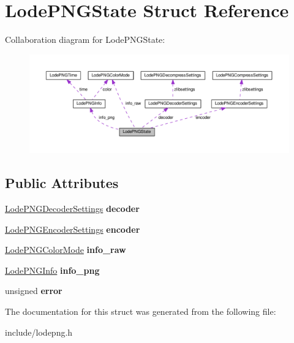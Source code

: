\hypertarget{struct_lode_p_n_g_state}{}\section{Lode\+P\+N\+G\+State Struct Reference}
\label{struct_lode_p_n_g_state}


Collaboration diagram for Lode\+P\+N\+G\+State\+:
\nopagebreak
\begin{figure}[H]
\begin{center}
\leavevmode
\includegraphics[width=350pt]{struct_lode_p_n_g_state__coll__graph}
\end{center}
\end{figure}
\subsection*{Public Attributes}
\begin{DoxyCompactItemize}
\item 
\hyperlink{struct_lode_p_n_g_decoder_settings}{Lode\+P\+N\+G\+Decoder\+Settings} {\bfseries decoder}\hypertarget{struct_lode_p_n_g_state_abd2c38ffc68f04b0e4159e1f97ba1f76}{}\label{struct_lode_p_n_g_state_abd2c38ffc68f04b0e4159e1f97ba1f76}

\item 
\hyperlink{struct_lode_p_n_g_encoder_settings}{Lode\+P\+N\+G\+Encoder\+Settings} {\bfseries encoder}\hypertarget{struct_lode_p_n_g_state_ac63d91db835129d02eb83bbe81de347e}{}\label{struct_lode_p_n_g_state_ac63d91db835129d02eb83bbe81de347e}

\item 
\hyperlink{struct_lode_p_n_g_color_mode}{Lode\+P\+N\+G\+Color\+Mode} {\bfseries info\+\_\+raw}\hypertarget{struct_lode_p_n_g_state_a597bc08de787147474d43adf8b6ceacf}{}\label{struct_lode_p_n_g_state_a597bc08de787147474d43adf8b6ceacf}

\item 
\hyperlink{struct_lode_p_n_g_info}{Lode\+P\+N\+G\+Info} {\bfseries info\+\_\+png}\hypertarget{struct_lode_p_n_g_state_a08d9ac43c995fcf34d72b1d37047b6fa}{}\label{struct_lode_p_n_g_state_a08d9ac43c995fcf34d72b1d37047b6fa}

\item 
unsigned {\bfseries error}\hypertarget{struct_lode_p_n_g_state_a1a00a050da588cf3c2b7a6252bebb0cd}{}\label{struct_lode_p_n_g_state_a1a00a050da588cf3c2b7a6252bebb0cd}

\end{DoxyCompactItemize}


The documentation for this struct was generated from the following file\+:\begin{DoxyCompactItemize}
\item 
include/lodepng.\+h\end{DoxyCompactItemize}
